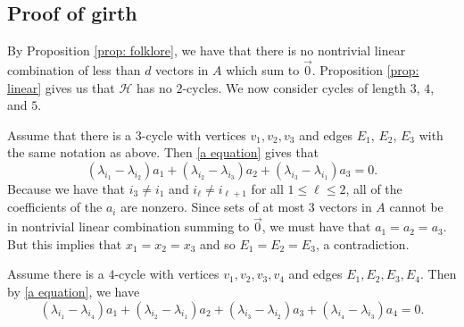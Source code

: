 \documentclass[12pt]{article}%
\begin{document}
\subsection{Proof of girth}\label{sec: coding theory girth}
By Proposition \ref{prop: folklore}, we have that there is no nontrivial linear combination of less than $d$ vectors in $A$ which sum to $\vec{0}$. Proposition \ref{prop: linear} gives us that $\mathcal{H}$ has no $2$-cycles. We now consider cycles of length $3$, $4$, and $5$. 

\medskip {} Assume that there is a $3$-cycle with vertices $v_1, v_2, v_3$ and edges $E_1$, $E_2$, $E_3$ with the same notation as above. Then \eqref{a equation} gives that 
\[
(\lambda_{i_1} - \lambda_{i_2})a_1 + (\lambda_{i_2} - \lambda_{i_3})a_2 + (\lambda_{i_3} - \lambda_{i_1})a_3 = 0.
\]
Because we have that  $i_3\not = i_1$ and $i_\ell \not = i_{\ell+1}$ for all $1\leq \ell \leq 2$, all of the coefficients of the $a_i$ are nonzero. Since sets of at most $3$ vectors in $A$ cannot be in nontrivial linear combination summing to $\vec{0}$, we must have that $a_1 = a_2 = a_3$. But this implies that $x_1 = x_2 = x_3$ and so $E_1 = E_2 = E_3$, a contradiction.

\medskip {} Assume there is a $4$-cycle with vertices $v_1, v_2 , v_3, v_4$ and edges $E_1,E_2 , E_3, E_4$. Then by \eqref{a equation}, we have 
\[
(\lambda_{i_1} - \lambda_{i_4})a_1 + (\lambda_{i_2} - \lambda_{i_1})a_2 + (\lambda_{i_3} - \lambda_{i_2})a_3 + (\lambda_{i_4} - \lambda_{i_3})a_4 = 0.
\]
\end{document}
